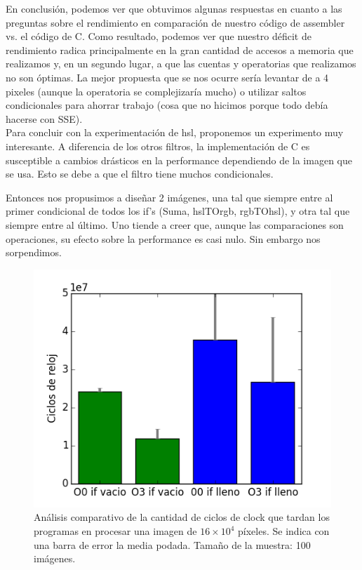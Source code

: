 En conclusión, podemos ver que obtuvimos algunas respuestas en cuanto a las preguntas sobre el rendimiento en comparación de nuestro código de assembler vs. el código de C. Como resultado, podemos ver que nuestro déficit de rendimiento radica principalmente en la gran cantidad de accesos a memoria que realizamos y, en un segundo lugar, a que las cuentas y operatorias que realizamos no son óptimas.
La mejor propuesta que se nos ocurre sería levantar de a 4 pixeles (aunque la operatoria se complejizaría mucho) o utilizar saltos condicionales para ahorrar trabajo (cosa que no hicimos porque todo debía hacerse con SSE).
\\

Para concluir con la experimentación de hsl, proponemos un experimento muy interesante. A diferencia de los otros filtros, la implementación de C es susceptible a cambios drásticos en la performance dependiendo de la imagen que se usa. Esto se debe a que el filtro tiene muchos condicionales.

Entonces nos propusimos a diseñar 2 imágenes, una tal que siempre entre al primer condicional de todos los if's (Suma, hslTOrgb, rgbTOhsl), y otra tal que siempre entre al último. Uno tiende a creer que, aunque las comparaciones son operaciones, su efecto sobre la performance es casi nulo. Sin embargo nos sorpendimos.


\begin{figure}[H] 
	\centering
  \includegraphics[scale=0.7]{hsl-ifs.png}
  \caption{Análisis comparativo de la cantidad de ciclos de clock que tardan los programas en procesar una imagen de $16\times 10^4$ píxeles. Se indica con una barra de error la media podada. Tamaño de la muestra: 100 imágenes.}
\end{figure}


